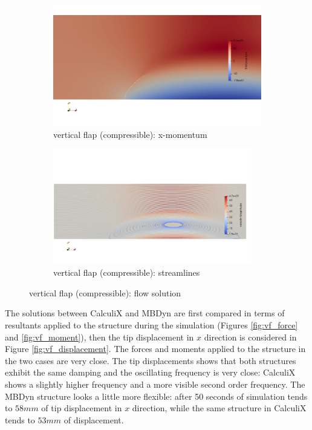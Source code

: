 \begin{figure}[htbp!]
	\centering
	\begin{subfigure}{0.9\textwidth}
	\centering
	\includegraphics[width=\textwidth, trim=0 150 0 150, clip]{images/comp_flap/x-mom.png}
	\caption{vertical flap (compressible): x-momentum}
	\end{subfigure}
	\begin{subfigure}{\textwidth}
	\centering
	\includegraphics[width=0.95\textwidth, trim=0 150 0 150, clip]{images/comp_flap/vel-stream.png}
	\caption{vertical flap (compressible): streamlines}
	\end{subfigure}
	\caption{vertical flap (compressible): flow solution}
	\label{fig:vf_comp_sol}
\end{figure}


The solutions between CalculiX and MBDyn are first compared in terms of resultants applied to the structure during the simulation (Figures \ref{fig:vf_force} and \ref{fig:vf_moment}), then the tip displacement in $x$ direction is considered in Figure \ref{fig:vf_displacement}. The forces and moments applied to the structure in the two cases are very close. 
The tip displacements shows that both structures exhibit the same damping and the oscillating frequency is very close: CalculiX shows a slightly higher frequency and a more visible second order frequency. The MBDyn structure looks a little more flexible: after 50 seconds of simulation tends to $58mm$ of tip displacement in $x$ direction, while the same structure in CalculiX tends to $53mm$ of displacement. 

